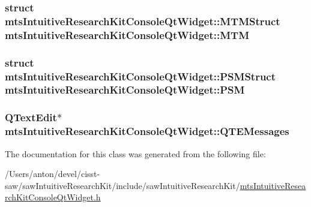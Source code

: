\subsubsection[{M\+T\+M}]{\setlength{\rightskip}{0pt plus 5cm}struct {\bf mts\+Intuitive\+Research\+Kit\+Console\+Qt\+Widget\+::\+M\+T\+M\+Struct}  mts\+Intuitive\+Research\+Kit\+Console\+Qt\+Widget\+::\+M\+T\+M\hspace{0.3cm}{\ttfamily [protected]}}\label{classmts_intuitive_research_kit_console_qt_widget_a0a6cea1fb1859503070a4c69a7af9219}
\hypertarget{classmts_intuitive_research_kit_console_qt_widget_a49312c620f564837efee52e371e81051}{}
\subsubsection[{P\+S\+M}]{\setlength{\rightskip}{0pt plus 5cm}struct {\bf mts\+Intuitive\+Research\+Kit\+Console\+Qt\+Widget\+::\+P\+S\+M\+Struct}  mts\+Intuitive\+Research\+Kit\+Console\+Qt\+Widget\+::\+P\+S\+M\hspace{0.3cm}{\ttfamily [protected]}}\label{classmts_intuitive_research_kit_console_qt_widget_a49312c620f564837efee52e371e81051}
\hypertarget{classmts_intuitive_research_kit_console_qt_widget_a093140f95bcc868675cf280ac128f697}{}
\subsubsection[{Q\+T\+E\+Messages}]{\setlength{\rightskip}{0pt plus 5cm}Q\+Text\+Edit$\ast$ mts\+Intuitive\+Research\+Kit\+Console\+Qt\+Widget\+::\+Q\+T\+E\+Messages\hspace{0.3cm}{\ttfamily [protected]}}\label{classmts_intuitive_research_kit_console_qt_widget_a093140f95bcc868675cf280ac128f697}


The documentation for this class was generated from the following file\+:\begin{DoxyCompactItemize}
\item 
/\+Users/anton/devel/cisst-\/saw/saw\+Intuitive\+Research\+Kit/include/saw\+Intuitive\+Research\+Kit/\hyperlink{mts_intuitive_research_kit_console_qt_widget_8h}{mts\+Intuitive\+Research\+Kit\+Console\+Qt\+Widget.\+h}\end{DoxyCompactItemize}

